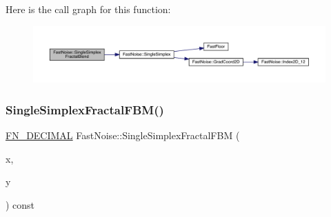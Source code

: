 Here is the call graph for this function\+:
\nopagebreak
\begin{figure}[H]
\begin{center}
\leavevmode
\includegraphics[width=350pt]{d1/dd8/class_fast_noise_af076ea4b492ce8e166816c5842ce43da_cgraph}
\end{center}
\end{figure}
\mbox{\label{class_fast_noise_af7e3a4be65f1e27d1af76111a382adbc}} 
\subsubsection{\texorpdfstring{Single\+Simplex\+Fractal\+F\+B\+M()}{SingleSimplexFractalFBM()}\hspace{0.1cm}{\footnotesize\ttfamily [1/2]}}
{\footnotesize\ttfamily \mbox{\hyperlink{_fast_noise_8h_a75a9ef6d2541c4921815b885bfd449c3}{F\+N\+\_\+\+D\+E\+C\+I\+M\+AL}} Fast\+Noise\+::\+Single\+Simplex\+Fractal\+F\+BM (\begin{DoxyParamCaption}\item[{\mbox{\hyperlink{_fast_noise_8h_a75a9ef6d2541c4921815b885bfd449c3}{F\+N\+\_\+\+D\+E\+C\+I\+M\+AL}}}]{x,  }\item[{\mbox{\hyperlink{_fast_noise_8h_a75a9ef6d2541c4921815b885bfd449c3}{F\+N\+\_\+\+D\+E\+C\+I\+M\+AL}}}]{y }\end{DoxyParamCaption}) const\hspace{0.3cm}{\ttfamily [private]}}


